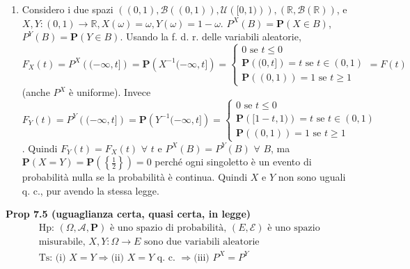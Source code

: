 \documentclass{article}
\begin{document}
\begin{enumerate}
\item Considero i due spazi $\left( \left( 0,1\right) ,\mathcal{B}\left(
\left( 0,1\right) \right) ,\mathcal{U}\left( [0,1)\right) \right) ,\left( 
\mathbb{R}
,\mathcal{B}\left( 
\mathbb{R}
\right) \right) $, e $X,Y:\left( 0,1\right) \rightarrow 
\mathbb{R}
,X\left( \omega \right) =\omega ,Y\left( \omega \right) =1-\omega $. $%
P^{X}\left( B\right) =\mathbf{P}\left( X\in B\right) $, $P^{Y}\left(
B\right) =\mathbf{P}\left( Y\in B\right) $. Usando la f. d. r. delle
variabili aleatorie, $F_{X}\left( t\right) =P^{X}\left( (-\infty ,t]\right) =%
\mathbf{P}\left( X^{-1}(-\infty ,t]\right) =\left\{ 
\begin{array}{c}
0\text{ se }t\leq 0 \\ 
\mathbf{P}\left( (0,t]\right) =t\text{ se }t\in \left( 0,1\right) \\ 
\mathbf{P}\left( \left( 0,1\right) \right) =1\text{ se }t\geq 1%
\end{array}%
\right. =F\left( t\right) $ (anche $P^{X}$ \`{e} uniforme). Invece $%
F_{Y}\left( t\right) =P^{Y}\left( (-\infty ,t]\right) =\mathbf{P}\left(
Y^{-1}(-\infty ,t]\right) =\left\{ 
\begin{array}{c}
0\text{ se }t\leq 0 \\ 
\mathbf{P}\left( [1-t,1)\right) =t\text{ se }t\in \left( 0,1\right) \\ 
\mathbf{P}\left( \left( 0,1\right) \right) =1\text{ se }t\geq 1%
\end{array}%
\right. $. Quindi $F_{Y}\left( t\right) =F_{X}\left( t\right) $ $\forall $ $%
t $ e $P^{X}\left( B\right) =P^{Y}\left( B\right) $ $\forall $ $B$, ma $%
\mathbf{P}\left( X=Y\right) =\mathbf{P}\left( \left\{ \frac{1}{2}\right\}
\right) =0$ perch\'{e} ogni singoletto \`{e} un evento di probabilit\`{a}
nulla se la probabilit\`{a} \`{e} continua. Quindi $X$ e $Y$ non sono uguali
q. c., pur avendo la stessa legge.
\end{enumerate}

\textbf{Prop 7.5 (uguaglianza certa, quasi certa, in legge)}%
\begin{gather*}
\text{Hp: }\left( \Omega ,\mathcal{A},\mathbf{P}\right) \text{ \`{e} uno
spazio di probabilit\`{a}, }\left( E,\mathcal{E}\right) \text{ \`{e} uno
spazio } \\
\text{misurabile, }X,Y:\Omega \rightarrow E\text{ sono due variabili
aleatorie} \\
\text{Ts: (i) }X=Y\Longrightarrow \text{(ii) }X=Y\text{ q. c. }%
\Longrightarrow \text{(iii) }P^{X}=P^{Y}
\end{gather*}
\end{document}
